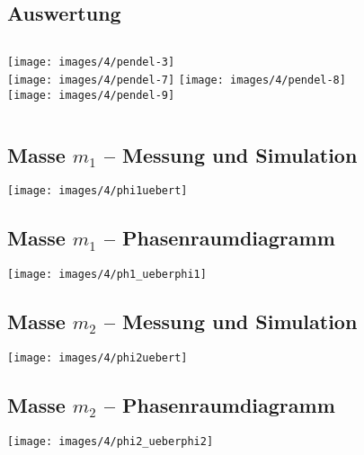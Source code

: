 \documentclass[compress,11pt]{beamer}
\begin{document}
\subsection{Auswertung}
\begin{frame}
\begin{columns}
\texttt{[image: images/4/pendel-3]}\\
\texttt{[image: images/4/pendel-7]}
\texttt{[image: images/4/pendel-8]}\\
\texttt{[image: images/4/pendel-9]}
\end{columns}
\end{frame}

\subsection*{Masse $m_1$ -- Messung und Simulation}
\begin{frame}
\texttt{[image: images/4/phi1uebert]}
\end{frame}

\subsection*{Masse $m_1$ -- Phasenraumdiagramm}
\begin{frame}
\texttt{[image: images/4/ph1\_ueberphi1]}
\end{frame}

\subsection*{Masse $m_2$ -- Messung und Simulation}
\begin{frame}
\texttt{[image: images/4/phi2uebert]}
\end{frame}

\subsection*{Masse $m_2$ -- Phasenraumdiagramm}
\begin{frame}
\texttt{[image: images/4/phi2\_ueberphi2]}
\end{frame}

\begin{frame}
\end{frame}
\end{document}

